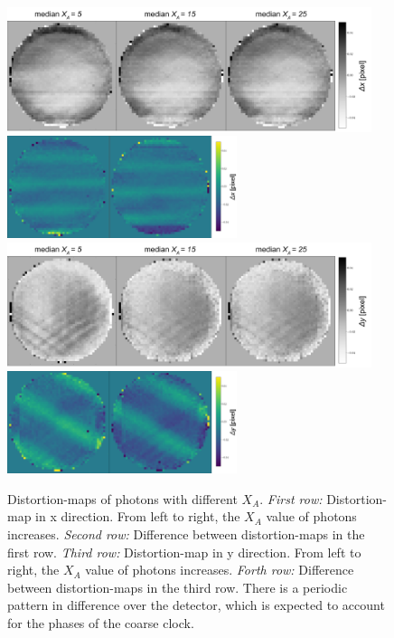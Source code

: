 \documentclass[12pt, preprint]{aastex61}
\begin{document}
\begin{figure}[p]
\begin{center}
\includegraphics[width=0.95\textwidth]{figures/xa-x-new}
\includegraphics[width=0.6\textwidth]{figures/dif-xa-x-new}
\includegraphics[width=0.95\textwidth]{figures/xa-y-new}
\includegraphics[width=0.6\textwidth]{figures/dif-xa-y-new}

\end{center}
\caption{%
  \label{distortion_xa}
  Distortion-maps of photons with different $X_A$.
  \emph{First row:} Distortion-map in x direction.
  From left to right, the $X_A$ value of photons increases.
  \emph{Second row:} Difference between distortion-maps in the first row.
  \emph{Third row:} Distortion-map in y direction.
  From left to right, the $X_A$ value of photons increases.
  \emph{Forth row:} Difference between distortion-maps in the third row.
  There is a periodic pattern in difference over the detector, which is expected to account for the phases of the coarse clock.
  }
\end{figure}
\end{document}
